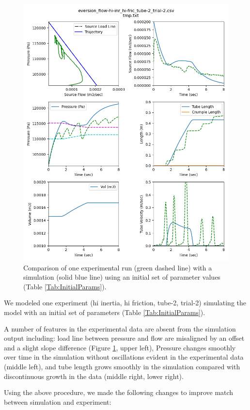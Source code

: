 \documentclass[letterpaper]{article}
\begin{document}
%
%
%

\begin{figure}\centering
\includegraphics[width=.75\textwidth]{Set6wInitialParams.png}
\caption{Comparison of one experimental run (green dashed line)
with a simulation (solid blue line)
using an initial set of parameter values (Table \ref{Tab:InitialParams}).}
\label{Fig:InitialSimCompare}
\end{figure}


We modeled one experiment (hi inertia, hi friction, tube-2, trial-2)
simulating the model with
an initial set of parameters (Table \ref{Tab:InitialParams}).

A number of features in the experimental data are absent from the simulation
output
including: load line between pressure and flow are misaligned by an offset and
a slight slope difference (Figure \ref{Fig:InitialSimCompare}, upper left),
Pressure changes smoothly over time in the simulation without oscillations
evident in the experimental data (middle left), and tube length grows smoothly
in the simulation compared with discontinuous growth in the data (middle right,
lower right).

Using the above procedure, we made the following changes to improve match
between simulation and experiment:
\end{document}
